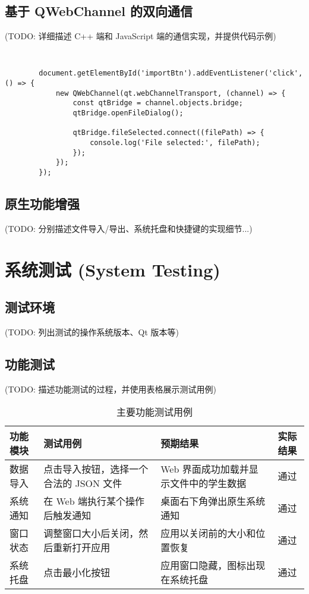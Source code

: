 \documentclass[12pt, a4paper]{article}
\begin{document}
	\subsection{基于 QWebChannel 的双向通信}
	(TODO: 详细描述 C++ 端和 JavaScript 端的通信实现，并提供代码示例)
	\begin{lstlisting}[style=cpp_style, caption={C++ WebBridge 暴露接口}, label={code:bridge-cpp}]
	
	\end{lstlisting}
	\begin{lstlisting}
		document.getElementById('importBtn').addEventListener('click', () => {
			new QWebChannel(qt.webChannelTransport, (channel) => {
				const qtBridge = channel.objects.bridge;
				qtBridge.openFileDialog();
			
				qtBridge.fileSelected.connect((filePath) => {
					console.log('File selected:', filePath);
				});
			});
		});
	\end{lstlisting}
	
	\subsection{原生功能增强}
	(TODO: 分别描述文件导入/导出、系统托盘和快捷键的实现细节...)
	
	\section{系统测试 (System Testing)}
	\subsection{测试环境}
	(TODO: 列出测试的操作系统版本、Qt 版本等)
	\subsection{功能测试}
	(TODO: 描述功能测试的过程，并使用表格展示测试用例)
	\begin{table}[h]
		\centering
		\caption{主要功能测试用例}
		\label{tab:testcases}
		\begin{tabularx}{\textwidth}{|l|X|X|c|}
			\hline
			\bfseries 功能模块 & \bfseries 测试用例 & \bfseries 预期结果 & \bfseries 实际结果 \\
			\hline
			数据导入 & 点击导入按钮，选择一个合法的 JSON 文件 & Web 界面成功加载并显示文件中的学生数据 & 通过 \\
			\hline
			系统通知 & 在 Web 端执行某个操作后触发通知 & 桌面右下角弹出原生系统通知 & 通过 \\
			\hline
			窗口状态 & 调整窗口大小后关闭，然后重新打开应用 & 应用以关闭前的大小和位置恢复 & 通过 \\
			\hline
			系统托盘 & 点击最小化按钮 & 应用窗口隐藏，图标出现在系统托盘 & 通过 \\
			\hline
		\end{tabularx}
	\end{table}
	
\end{document}

